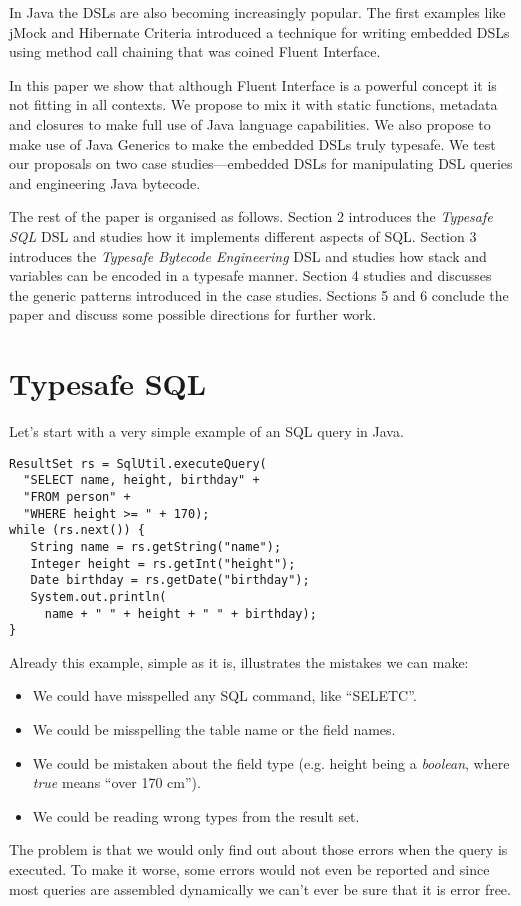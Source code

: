 \documentclass{sig-alternate}
\begin{document}
In Java the DSLs are also becoming increasingly popular. The first examples like jMock \cite{freeman2004jsr} and Hibernate Criteria \cite{bauer2005ha} introduced a technique for writing embedded DSLs using method call chaining that was coined Fluent Interface. 

In this paper we show that although Fluent Interface is a powerful concept it is not fitting in all contexts. We propose to mix it with static functions, metadata and closures to make full use of Java language capabilities. We also propose to make use of Java Generics to make the embedded DSLs truly typesafe. We test our proposals on two case studies---embedded DSLs for manipulating DSL queries and engineering Java bytecode.

The rest of the paper is organised as follows. Section 2 introduces the \emph{Typesafe SQL} DSL and studies how it implements different aspects of SQL. Section 3 introduces the \emph{Typesafe Bytecode Engineering} DSL and studies how stack and variables can be encoded in a typesafe manner. Section 4 studies and discusses the generic patterns introduced in the case studies. Sections 5 and 6 conclude the paper and discuss some possible directions for further work.

\section{Typesafe SQL}

Let's start with a very simple example of an SQL query in Java. 
\begin{verbatim}
ResultSet rs = SqlUtil.executeQuery(
  "SELECT name, height, birthday" + 
  "FROM person" +
  "WHERE height >= " + 170);
while (rs.next()) {
   String name = rs.getString("name");
   Integer height = rs.getInt("height");
   Date birthday = rs.getDate("birthday");
   System.out.println(
     name + " " + height + " " + birthday);
}
\end{verbatim}

Already this example, simple as it is, illustrates the mistakes we can make:
\begin{itemize}
\item We could have misspelled any SQL command, like ``SELETC''.
\item We could be misspelling the table name or the field names.
\item We could be mistaken about the field type (e.g. height being a \emph{boolean}, where \emph{true} means ``over 170 cm'').
\item We could be reading wrong types from the result set.
\end{itemize}
The problem is that we would only find out about those errors when the query is executed. To make it worse, some errors would not even be reported and since most queries are assembled dynamically we can't ever be sure that it is error free.
\end{document}
